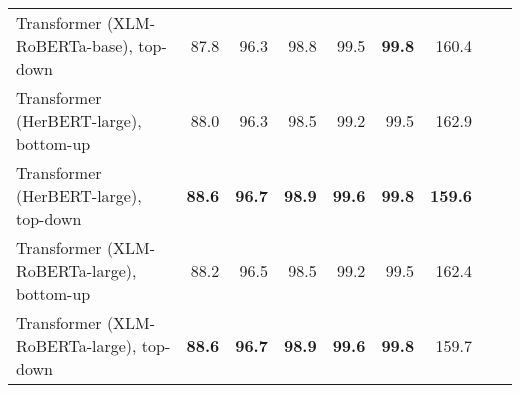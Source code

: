 \begin{table}[ht!]
{\begin{tabular}{lrrrrrrrr}
  Transformer (XLM-RoBERTa-base), top-down & 87.8 & 96.3 & 98.8 & 99.5 & \textbf{99.8} & 160.4 \\ 
  Transformer (HerBERT-large), bottom-up & 88.0 & 96.3 & 98.5 & 99.2 & 99.5 & 162.9 \\ 
  Transformer (HerBERT-large), top-down & \textbf{88.6} & \textbf{96.7} & \textbf{98.9} & \textbf{99.6} & \textbf{99.8} & \textbf{159.6} \\ 
  Transformer (XLM-RoBERTa-large), bottom-up & 88.2 & 96.5 & 98.5 & 99.2 & 99.5 & 162.4 \\ 
  Transformer (XLM-RoBERTa-large), top-down & \textbf{88.6} & \textbf{96.7} & \textbf{98.9} & \textbf{99.6} & \textbf{99.8} & 159.7 \\ 
   \hline
\end{tabular}
}
\end{table}




